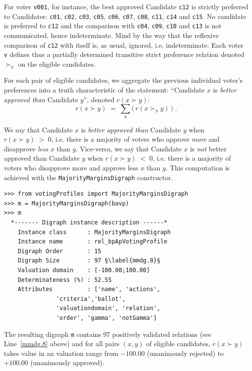 For voter \texttt{v001}, for instance, the best approved Candidate \texttt{c12} is strictly preferred to Candidates: \texttt{c01}, \texttt{c02}, \texttt{c03}, \texttt{c05}, \texttt{c06}, \texttt{c07}, \texttt{c08}, \texttt{c11}, \texttt{c14} and \texttt{c15}. No candidate is preferred to \texttt{c12} and the comparison with \texttt{c04}, \texttt{c09}, \texttt{c10} and \texttt{c13} is not communicated, hence indeterminate. Mind by the way that the reflexive comparison of \texttt{c12} with itself is, as usual, ignored, i.e. indeterminate. Each voter \texttt{v} defines thus a partially determined transitive strict preference relation denoted $\succ_{\mathtt{v}}$ on the eligible candidates.

For each pair of eligible candidates, we aggregate the previous individual voter's preferences into a truth characteristic of the statement: ``Candidate $x$ is \emph{better approved than} Candidate $y$'', denoted $r(x \succ y)$:
\begin{equation}
  r(x \succ y)\;=\; \sum_{\mathtt{v}} \big(\,r(x \succ_{\mathtt{v}} y)\, \big)\;.
\end{equation}  

We say that Candidate $x$ is \emph{better approved than} Candidate $y$ when $r(x \succ y)\;>\;0$, i.e. there is a majority of voters who approve \emph{more} and disapprove \emph{less} $x$ than $y$. Vice-versa, we say that Candidate $x$ is \emph{not} better approved than Candidate $y$ when $r(x \succ y)\;<\;0$, i.e. there is a majority of voters who disapprove more and approve less $x$ than $y$. This computation is achieved with the \texttt{MajorityMarginsDigraph} constructor.
\begin{lstlisting}
>>> from votingProfiles import MajorityMarginsDigraph
>>> m = MajorityMarginsDigraph(bavp)
>>> m
  *------- Digraph instance description ------*
    Instance class      : MajorityMarginsDigraph
    Instance name       : rel_bpApVotingProfile
    Digraph Order       : 15
    Digraph Size        : 97 §\label{mmdg.8}§
    Valuation domain    : [-100.00;100.00]
    Determinateness (%) : 52.55
    Attributes          : ['name', 'actions',
               'criteria','ballot',
               'valuationdomain', 'relation',
               'order', 'gamma', 'notGamma']
\end{lstlisting}

The resulting digraph \texttt{m} contains 97 positively validated relations (see Line~\ref{mmdg.8} above) and for all pairs $(x,y)$ of eligible candidates, $r(x \succ y)$ takes value in an valuation range from $-100.00$ (unanimously rejected) to $+100.00$ (unanimously approved).

